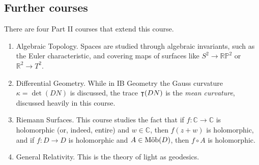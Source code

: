 \subsection{Further courses}
There are four Part II courses that extend this course.
\begin{enumerate}
	\item Algebraic Topology.
	      Spaces are studied through algebraic invariants, such as the Euler characteristic, and covering maps of surfaces like $S^2 \to \mathbb R \mathbb P^2$ or $\mathbb R^2 \to T^2$.
	\item Differential Geometry.
	      While in IB Geometry the Gauss curvature $\kappa = \det (DN)$ is discussed, the trace $\intercal (DN)$ is the \textit{mean curvature}, discussed heavily in this course.
	\item Riemann Surfaces.
	      This course studies the fact that if $f \colon \mathbb C \to \mathbb C$ is holomorphic (or, indeed, entire) and $w \in \mathbb C$, then $f(z+w)$ is holomorphic, and if $f \colon D \to D$ is holomorphic and $A \in \text{M\"ob}(D)$, then $f \circ A$ is holomorphic.
	\item General Relativity.
	      This is the theory of light as geodesics.
\end{enumerate}
